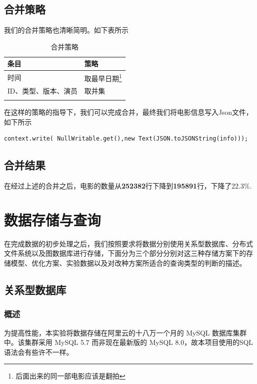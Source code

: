 \documentclass{ctexrep}
\begin{document}
	\section{合并策略}
	我们的合并策略也清晰简明。如下表所示\begin{longtable}{l|l}
		\hline
		条目 & 策略 \\
		\hline
		\hline
		时间 & 取最早日期\footnote{后面出来的同一部电影应该是翻拍} \\
		ID、类型、版本、演员 & 取并集\\
		\hline
		\caption{合并策略}
	\end{longtable}
		在这样的策略的指导下，我们可以完成合并，最终我们将电影信息写入Json文件，如下所示\begin{lstlisting}
context.write( NullWritable.get(),new Text(JSON.toJSONString(info)));
\end{lstlisting}
\section{合并结果}
在经过上述的合并之后，电影的数量从\textbf{252382}行下降到\textbf{195891}行，下降了22.3\%.
	
	\chapter{数据存储与查询}
	在完成数据的初步处理之后，我们按照要求将数据分别使用关系型数据库、分布式文件系统以及图数据库进行存储，下面分为三个部分分别对这三种存储方案下的存储模型、优化方案、实验数据以及对改种方案所适合的查询类型的判断的描述。
	\section{关系型数据库}
	\subsection{概述}
	为提高性能，本实验将数据存储在阿里云的十八万一个月的 MySQL 数据库集群中。该集群采用 MySQL 5.7 而非现在最新版的 MySQL 8.0，故本项目使用的SQL语法会有些许不一样。
\end{document}
